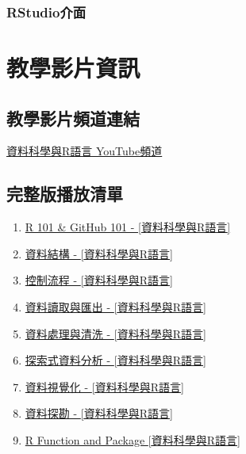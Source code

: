 \documentclass[
]{book}
\providecommand{\tightlist}{%
  \setlength{\itemsep}{0pt}\setlength{\parskip}{0pt}}
\begin{document}
\hypertarget{rstudioux4ecbux9762}{%
\subsection{RStudio介面}\label{rstudioux4ecbux9762}}

\hypertarget{video}{%
\chapter{教學影片資訊}\label{video}}

\hypertarget{ux6559ux5b78ux5f71ux7247ux983bux9053ux9023ux7d50}{%
\section{教學影片頻道連結}\label{ux6559ux5b78ux5f71ux7247ux983bux9053ux9023ux7d50}}

\href{https://www.youtube.com/channel/UC2ZZMRLibtq2fD-la4YV_nA/}{資料科學與R語言 YouTube頻道}

\hypertarget{ux5b8cux6574ux7248ux64adux653eux6e05ux55ae}{%
\section{完整版播放清單}\label{ux5b8cux6574ux7248ux64adux653eux6e05ux55ae}}

\begin{enumerate}
\def\labelenumi{\arabic{enumi}.}
\tightlist
\item
  \href{https://www.youtube.com/playlist?list=PLsKtsWy-7jOxTQiku-l0CkYZdL3uidOUC}{R 101 \& GitHub 101 - {[}資料科學與R語言{]}}
\item
  \href{https://www.youtube.com/playlist?list=PLsKtsWy-7jOwUra70JV-zBaSJc8p9Nlnu}{資料結構 - {[}資料科學與R語言{]}}
\item
  \href{https://www.youtube.com/playlist?list=PLsKtsWy-7jOwII8wk-t6_m4aee9wMg3-6}{控制流程 - {[}資料科學與R語言{]}}
\item
  \href{https://www.youtube.com/playlist?list=PLsKtsWy-7jOzlr_NL7_D--OvmR5ppvaZv}{資料讀取與匯出 - {[}資料科學與R語言{]}}
\item
  \href{https://www.youtube.com/playlist?list=PLsKtsWy-7jOxE3b_zXjA1EX8Job0i6F5S}{資料處理與清洗 - {[}資料科學與R語言{]}}
\item
  \href{https://www.youtube.com/playlist?list=PLsKtsWy-7jOzT7OvpzAXAHwPVnGtZhQD0}{探索式資料分析 - {[}資料科學與R語言{]}}
\item
  \href{https://www.youtube.com/playlist?list=PLsKtsWy-7jOxiRwgXZcxwUP7BKM-WVUV4}{資料視覺化 - {[}資料科學與R語言{]}}
\item
  \href{https://www.youtube.com/playlist?list=PLsKtsWy-7jOyxEedw_cMea3TBHguWRhmi}{資料探勘 - {[}資料科學與R語言{]}}
\item
  \href{https://www.youtube.com/playlist?list=PLsKtsWy-7jOwyavHjFwah57y2ThJ7Lxzr}{R Function and Package {[}資料科學與R語言{]}}
\end{enumerate}
\end{document}
